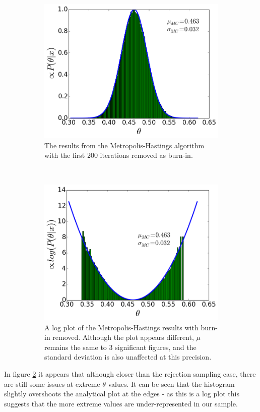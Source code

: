 \documentclass[a4paper,11pt,twoside]{article}
\begin{document}
\begin{figure}[!ht]
	\centering
	\begin{subfigure}[t]{0.4\textwidth}
		\centering
		\includegraphics[width=\textwidth]{metropolishastings-burnin.png}
		\caption{The results from the Metropolis-Hastings algorithm
		with the first 200 iterations removed as burn-in. }
		\label{fig:metropolisb}
	\end{subfigure}
	~
	\begin{subfigure}[t]{0.4\textwidth}
		\centering
		\includegraphics[width=\textwidth]{mhlog-burnin.png}
		\caption{A log plot of the Metropolis-Hastings results with
		burn-in removed. Although the plot appears different, $\mu$
		remains the same to 3 significant figures, and the standard deviation
		is also unaffected at this precision.}
		\label{fig:mhlogb}
	\end{subfigure}
	\caption{}\label{fig:mhplotsb}
\end{figure}
In figure \ref{fig:mhlogb} it appears that although closer than the rejection
sampling case, there are still some issues at extreme $\theta$ values. It can be seen that
the histogram slightly overshoots the analytical plot at the edges - as this is a log
plot this suggests that the more extreme values are under-represented in our
sample.
\end{document}
